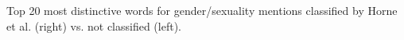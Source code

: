 Top 20 most distinctive words for gender/sexuality mentions classified by Horne et al. (right) vs. not classified (left).